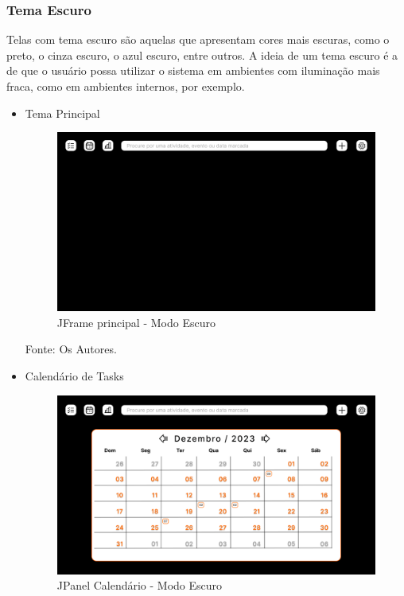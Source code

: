 \documentclass[a4paper,12pt]{article}
\begin{document}
\subsubsection{Tema Escuro}
Telas com tema escuro são aquelas que apresentam cores mais escuras, como o preto, o cinza escuro, o azul escuro, entre outros. A ideia de um tema escuro 
é a de que o usuário possa utilizar o sistema em ambientes com iluminação mais fraca, como em ambientes internos, por exemplo.
\pagebreak
\begin{itemize}
	\item Tema Principal
	\begin{figure}[H]
		\centering
		\includegraphics[scale=0.20]{prototypes/dark/Main Window.png}
		\caption{JFrame principal - Modo Escuro}
	\end{figure}
	\noindent Fonte: Os Autores.
	\item Calendário de Tasks
	\begin{figure}[H]
		\centering
		\includegraphics[scale=0.20]{prototypes/dark/Calendar Panel Window.png}
		\caption{JPanel Calendário - Modo Escuro}
	\end{figure}	

\end{itemize}
\end{document}
